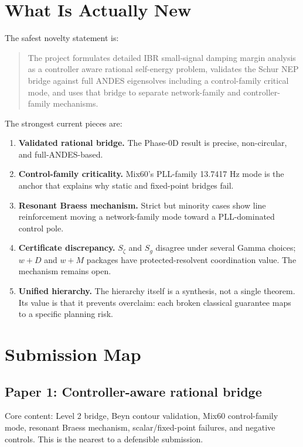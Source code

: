 \documentclass[11pt]{article}
\begin{document}
\section{What Is Actually New}

The safest novelty statement is:

\begin{quote}
The project formulates detailed IBR small-signal damping margin analysis as a
controller aware rational self-energy problem, validates the Schur NEP bridge
against full ANDES eigensolves including a control-family critical mode, and
uses that bridge to separate network-family and controller-family mechanisms.
\end{quote}

The strongest current pieces are:
\begin{enumerate}[leftmargin=*]
\item \textbf{Validated rational bridge.} The Phase-0D result is precise,
non-circular, and full-ANDES-based.
\item \textbf{Control-family criticality.} Mix60's PLL-family 13.7417 Hz mode
is the anchor that explains why static and fixed-point bridges fail.
\item \textbf{Resonant Braess mechanism.} Strict but minority cases show line
reinforcement moving a network-family mode toward a PLL-dominated control pole.
\item \textbf{Certificate discrepancy.} $S_\zeta$ and $S_g$ disagree under
several Gamma choices; $w+D$ and $w+M$ packages have protected-resolvent
coordination value. The mechanism remains open.
\item \textbf{Unified hierarchy.} The hierarchy itself is a synthesis, not a
single theorem. Its value is that it prevents overclaim: each broken classical
guarantee maps to a specific planning risk.
\end{enumerate}

\section{Submission Map}

\subsection*{Paper 1: Controller-aware rational bridge}
Core content: Level 2 bridge, Beyn contour validation, Mix60 control-family
mode, resonant Braess mechanism, scalar/fixed-point failures, and negative
controls. This is the nearest to a defensible submission.
\end{document}
